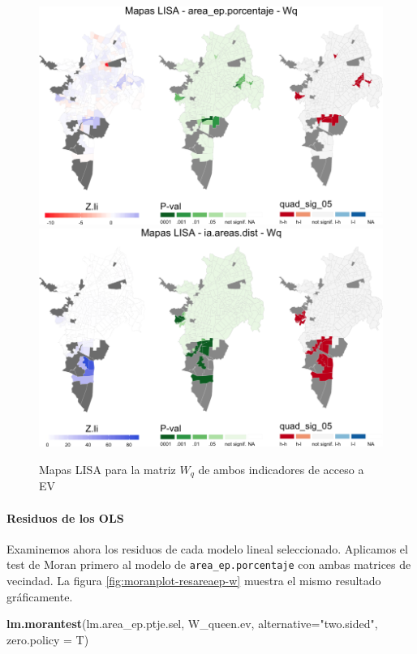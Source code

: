 \documentclass[12pt,]{book}
\newenvironment{Shaded}{\begin{snugshade}}{\end{snugshade}}
\newcommand{\KeywordTok}[1]{\textcolor[rgb]{0.13,0.29,0.53}{\textbf{#1}}}
\newcommand{\DataTypeTok}[1]{\textcolor[rgb]{0.13,0.29,0.53}{#1}}
\newcommand{\StringTok}[1]{\textcolor[rgb]{0.31,0.60,0.02}{#1}}
\newcommand{\NormalTok}[1]{#1}
\let\oldparagraph\paragraph
\renewcommand{\paragraph}[1]{\oldparagraph{#1}\mbox{}}
\begin{document}
\begin{figure}
\includegraphics[width=1\linewidth]{tesis-unigis_files/figure-latex/mapas-lisa-ev-wq-1} \includegraphics[width=1\linewidth]{tesis-unigis_files/figure-latex/mapas-lisa-ev-wq-2} \caption{Mapas LISA para la matriz $W_q$ de ambos indicadores de acceso a EV}\label{fig:mapas-lisa-ev-wq}
\end{figure}

\paragraph{Residuos de los OLS}\label{residuos-de-los-ols}

Examinemos ahora los residuos de cada modelo lineal seleccionado.
Aplicamos el test de Moran primero al modelo de
\texttt{area\_ep.porcentaje} con ambas matrices de vecindad. La figura
\ref{fig:moranplot-resareaep-w} muestra el mismo resultado gráficamente.

\begin{Shaded}
\begin{Highlighting}[]
\KeywordTok{lm.morantest}\NormalTok{(lm.area_ep.ptje.sel, }
\NormalTok{             W_queen.ev, }
             \DataTypeTok{alternative=}\StringTok{"two.sided"}\NormalTok{,}
             \DataTypeTok{zero.policy =}\NormalTok{ T)}
\end{Highlighting}
\end{Shaded}
\end{document}
